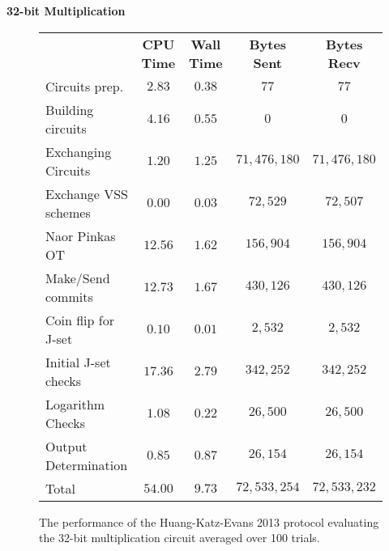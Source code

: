 \documentclass[ %
                    author={Nicholas Tutte},
                supervisor={Prof. Nigel Smart},
                    degree={MEng},
                     title={Secure Two Party Computation},
                  subtitle={A practical comparison of recent protocols},
                      type={Research - GG1K},
                      year={2015} ]{dissertation}
\begin{document}
				\FloatBarrier
				\noindent \textbf{32-bit Multiplication}
				\begin{figure}[!ht]
					\begin{tabular}{| p{4.3cm} | c c c c |}
						\hline
						 & \textbf{CPU Time} & \textbf{Wall Time} & \textbf{Bytes Sent} & \textbf{Bytes Recv} \\
						\thickhline
						Circuits prep. & $2.83$ & $0.38$ & $77$ & $77$ \\
						\hline
						Building circuits & $4.16$ & $0.55$ & $0$ & $0$ \\
						\hline
						Exchanging Circuits & $1.20$ & $1.25$ & $71,476,180$ & $71,476,180$ \\
						\hline
						Exchange VSS schemes & $0.00$ & $0.03$ & $72,529$ & $72,507$ \\
						\hline
						Naor Pinkas OT & $12.56$ & $1.62$ & $156,904$ & $156,904$ \\
						\hline
						Make/Send commits & $12.73$ & $1.67$ & $430,126$ & $430,126$ \\
						\hline
						Coin flip for J-set & $0.10$ & $0.01$ & $2,532$ & $2,532$ \\
						\hline
						Initial J-set checks & $17.36$ & $2.79$ & $342,252$ & $342,252$ \\
						\hline
						Logarithm Checks & $1.08$ & $0.22$ & $26,500$ & $26,500$ \\
						\hline
						Output Determination & $0.85$ & $0.87$ & $26,154$ & $26,154$ \\
						\thickhline
						Total & $54.00$ & $9.73$ & $72,533,254$ & $72,533,232$ \\
						\hline
					\end{tabular}
					\caption{The performance of the Huang-Katz-Evans 2013 protocol evaluating the 32-bit multiplication circuit averaged over 100 trials.\label{table:HKE_2013_Mul}}
				\end{figure}
\end{document}
